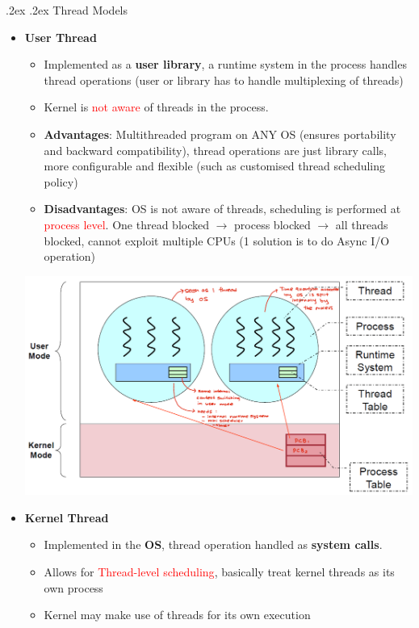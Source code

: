 \documentclass[13pt,landscape,a4paper]{article}
\makeatletter
\renewcommand{\subsection}{\@startsection{subsection}{1}{0mm}%
    {.2ex}%
    {.2ex}%
    {\sffamily\bfseries}}
\makeatother
\begin{document}
\begin{multicols*}{3}
        \subsection{Thread Models}
        \begin{itemize}
            \item \textbf{User Thread}
            \begin{itemize}
                \item Implemented as a \textbf{user library}, a runtime system in the process handles thread operations (user or library has to handle multiplexing of threads)
                \item Kernel is \textcolor{red}{not aware} of threads in the process.
                \item \textbf{Advantages}: Multithreaded program on ANY OS (ensures portability and backward compatibility), thread operations are just library calls, more configurable and flexible (such as customised thread scheduling policy)
                \item \textbf{Disadvantages}: OS is not aware of threads, scheduling is performed at \textcolor{red}{process level}. One thread blocked $\rightarrow$ process blocked $\rightarrow$ all threads blocked, cannot exploit multiple CPUs (1 solution is to do Async I/O operation)
            \end{itemize}
            \begin{center}
                \includegraphics[width=0.65\columnwidth]{user_thread}
            \end{center}
            \item \textbf{Kernel Thread}
            \begin{itemize}
                \item Implemented in the \textbf{OS}, thread operation handled as \textbf{system calls}.
                \item Allows for \textcolor{red}{Thread-level scheduling}, basically treat kernel threads as its own process
                \item Kernel may make use of threads for its own execution

\end{itemize}
\end{itemize}
\end{multicols*}
\end{document}
